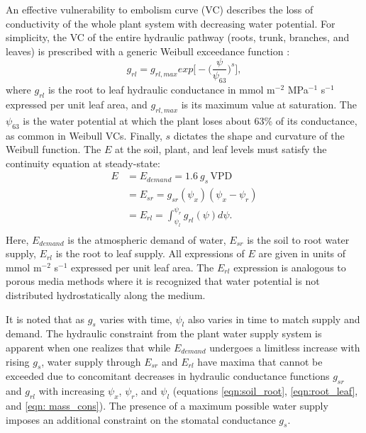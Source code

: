 \documentclass[utf8]{frontiersSCNS} %
\begin{document}
An effective vulnerability to embolism curve (VC) describes the loss of conductivity of the whole plant system with decreasing water potential. For simplicity, the VC of the entire hydraulic pathway (roots, trunk, branches, and leaves) is prescribed with a generic Weibull exceedance function \citep{sperry_what_2015}:
\begin{equation}
    \label{eqn:root_leaf}
    g_{rl} = g_{rl,max}exp\Big[-\Big(\frac{\psi}{\psi_{63}}\Big)^s\Big],
\end{equation}
where $g_{rl}$ is the root to leaf hydraulic conductance in mmol m$^{-2}$ MPa$^{-1}$ s$^{-1}$ expressed per unit leaf area, and $g_{rl,max}$ is its maximum value at saturation. The $\psi_{63}$ is the water potential at which the plant loses about 63\% of its conductance, as common in Weibull VCs. Finally, $s$ dictates the shape and curvature of the Weibull function. 
The $E$ at the soil, plant, and leaf levels must satisfy the continuity equation at steady-state:
\begin{equation}
    \label{eqn: mass_cons}
        \begin{split}
        E & = E_{demand} = 1.6\: g_s\, \text{VPD} \\
        & = E_{sr} = g_{sr}(\psi_x)(\psi_x - \psi_r)\\
        & = E_{rl} = \int_{\psi_l}^{\psi_r} g_{rl}(\psi) d\psi. \\
        \end{split}
\end{equation}
Here, $E_{demand}$ is the atmospheric demand of water, $E_{sr}$ is the soil to root water supply, $E_{rl}$ is the root to leaf supply. All expressions of $E$ are given in units of mmol m$^{-2}$ s$^{-1}$ expressed per unit leaf area. The $E_{rl}$ expression is analogous to porous media methods where it is recognized that water potential is not distributed hydrostatically along the medium.

It is noted that as $g_s$ varies with time, $\psi_l$ also varies in time to match supply and demand. The hydraulic constraint from the plant water supply system is apparent when one realizes that while $E_{demand}$ undergoes a limitless increase with rising $g_s$, water supply through $E_{sr}$ and $E_{rl}$ have maxima that cannot be exceeded due to concomitant decreases in hydraulic conductance functions $g_{sr}$ and $g_{rl}$ with increasing $\psi_x$, $\psi_r$, and $\psi_l$ (equations \ref{eqn:soil_root}, \ref{eqn:root_leaf}, and \ref{eqn: mass_cons}). The presence of a maximum possible water supply imposes an additional constraint on the stomatal conductance $g_s$.  
\end{document}

